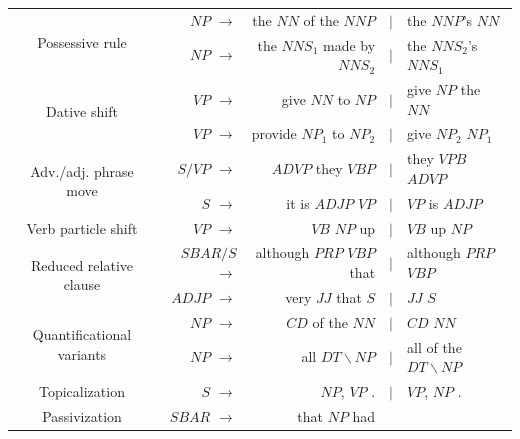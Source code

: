 \documentclass[11pt]{article}
\begin{document}
\begin{table}[!ht]
  \begin{center}
  \begin{tabular}{|c|rrcl|}
    \hline
    \multirow{2}{*}{Possessive rule} & $\mathit{NP}$ $\rightarrow$ & the
    $\mathit{NN}$ of the $\mathit{NNP}$ & $\mid$ & the
    $\mathit{NNP}$'s $\mathit{NN}$ \\
    & $\mathit{NP}$ $\rightarrow$  & the $\mathit{NNS}_1$ made by
    $\mathit{NNS}_2$ & $\mid$ & the $\mathit{NNS}_2$'s
    $\mathit{NNS}_1$ \\
    \hline
    \multirow{2}{*}{Dative shift} & $\mathit{VP}$ $\rightarrow$ & give
    $\mathit{NN}$ to $\mathit{NP}$ & $\mid$ & give $\mathit{NP}$ the
    $\mathit{NN}$ \\
    & $\mathit{VP}$ $\rightarrow$ & provide $\mathit{NP}_1$ to
    $\mathit{NP}_2$ & $\mid$ & give $\mathit{NP}_2$
    $\mathit{NP}_1$ \\
    \hline
    \hline
    \multirow{2}{*}{Adv./adj. phrase move} & 
    $\mathit{S/VP}$ $\rightarrow$ & $\mathit{ADVP}$ they $\mathit{VBP}$
    & $\mid$ & they $\mathit{VPB}$ $\mathit{ADVP}$ \\
    & $\mathit{S}$ $\rightarrow$ & it is $\mathit{ADJP}$ $\mathit{VP}$
    & $\mid$ & $\mathit{VP}$ is $\mathit{ADJP}$ \\
    \hline
    Verb particle shift & 
    $\mathit{VP}$ $\rightarrow$ & $\mathit{VB}$ $\mathit{NP}$ up &
    $\mid$ & $\mathit{VB}$ up $\mathit{NP}$ \\
    \hline
    \multirow{2}{*}{Reduced relative clause} & $\mathit{SBAR/S}$ $\rightarrow$ &
    although $\mathit{PRP}$ $\mathit{VBP}$ that & $\mid$ &although
    $\mathit{PRP}$ $\mathit{VBP}$ \\
    & $\mathit{ADJP}$ $\rightarrow$ &
    very $\mathit{JJ}$ that $\mathit{S}$ & $\mid$ & $\mathit{JJ}$ $\mathit{S}$ \\
    \hline
    \multirow{2}{*}{Quantificational variants} & 
    $\mathit{NP}$ $\rightarrow$ & $\mathit{CD}$ of the $\mathit{NN}$
    & $\mid$ & $\mathit{CD}$ $\mathit{NN}$ \\
    & $\mathit{NP}$ $\rightarrow$ & all $\mathit{DT\backslash NP}$
    & $\mid$ & all of the $\mathit{DT\backslash NP}$ \\
    \hline
    Topicalization  & $\mathit{S}$ $\rightarrow$ & $\mathit{NP}$,
    $\mathit{VP}$ . & $\mid$ & $\mathit{VP}$, $\mathit{NP}$ . \\
    \hline
    \hline
    Passivization &
    $\mathit{SBAR}$ $\rightarrow$ & that $\mathit{NP}$ had

\end{tabular}
\end{center}
\end{table}
\end{document}
